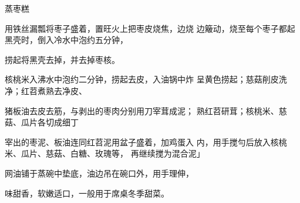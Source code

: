 \begin{recipe}{蒸枣糕}

\ingredients


\cooking

\step 用铁丝漏瓢将枣子盛着，置旺火上把枣皮烧焦，边烧 边簸动，烧至每个枣子都起黑壳时，倒入冷水中泡约五分钟，

捞起将黑壳去掉，并去掉枣核。

\step 核桃米入沸水中泡约二分钟，捞起去皮，入油锅中炸 呈黄色捞起；慈菇削皮洗净；红苕煮熟去净皮、

猪板油去皮去筋，与剥出的枣肉分别用刀宰茸成泥； 熟红苕研茸；核桃米、慈菇、瓜片各切成细丁

\step 宰出的枣泥、板油连同红苕泥用盆子盛着，加鸡蛋入 内，用手搅勻后放入核桃米、瓜片、慈菇、白糖、玫瑰等， 再继续搅为混合泥」

\step 网油铺于蒸碗中垫底，油边吊在碗口外，用手理伸，

\notes

味甜香，软嫩适口，一般用于席桌冬季甜菜。

\end{recipe}

